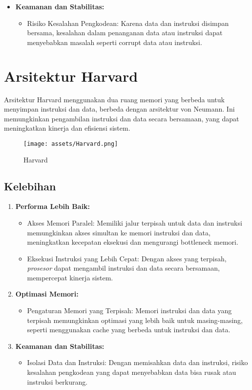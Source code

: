 \documentclass{article}
\begin{document}
\begin{enumerate}[label=\arabic*.]
\begin{itemize}
    \item \textbf{Keamanan dan Stabilitas:}
    \begin{itemize}
      \item Risiko Kesalahan Pengkodean: Karena data dan instruksi disimpan bersama, kesalahan dalam penanganan data atau instruksi dapat menyebabkan masalah seperti corrupt data atau instruksi.
    \end{itemize}
  \end{itemize}
\end{enumerate}

\section{Arsitektur Harvard}

Arsitektur Harvard menggunakan dua ruang memori yang berbeda untuk menyimpan instruksi dan data, berbeda dengan arsitektur von Neumann. Ini memungkinkan pengambilan instruksi dan data secara bersamaan, yang dapat meningkatkan kinerja dan efisiensi sistem.
\begin{figure}
    \centering
    \texttt{[image: assets/Harvard.png]}
    \caption{Harvard}
    \label{fig:enter-label}
\end{figure}
\subsection{Kelebihan}

\begin{enumerate}[label=\arabic*.]
  \item \textbf{Performa Lebih Baik:}
  \begin{itemize}
    \item Akses Memori Paralel: Memiliki jalur terpisah untuk data dan instruksi memungkinkan akses simultan ke memori instruksi dan data, meningkatkan kecepatan eksekusi dan mengurangi bottleneck memori.
    \item Eksekusi Instruksi yang Lebih Cepat: Dengan akses yang terpisah, \textit{prosesor} dapat mengambil instruksi dan data secara bersamaan, mempercepat kinerja sistem.
  \end{itemize}
  
  \item \textbf{Optimasi Memori:}
  \begin{itemize}
    \item Pengaturan Memori yang Terpisah: Memori instruksi dan data yang terpisah memungkinkan optimasi yang lebih baik untuk masing-masing, seperti menggunakan cache yang berbeda untuk instruksi dan data.
  \end{itemize}
  
  \item \textbf{Keamanan dan Stabilitas:}
  \begin{itemize}
    \item Isolasi Data dan Instruksi: Dengan memisahkan data dan instruksi, risiko kesalahan pengkodean yang dapat menyebabkan data bisa rusak atau instruksi berkurang.
  \end{itemize}
\end{enumerate}
\end{document}
